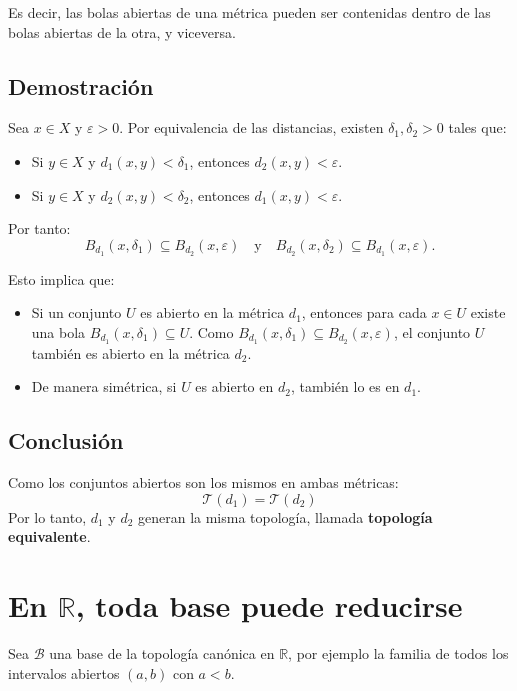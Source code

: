 \documentclass[12pt]{article}
\begin{document}
Es decir, las bolas abiertas de una métrica pueden ser contenidas dentro
de las bolas abiertas de la otra, y viceversa.

\subsection*{Demostración}
Sea \( x \in X \) y \( \varepsilon > 0 \).
Por equivalencia de las distancias, existen \( \delta_1, \delta_2 > 0 \) tales que:

\begin{itemize}
  \item Si \( y \in X \) y \( d_1(x,y) < \delta_1 \), entonces \( d_2(x,y) < \varepsilon \).
  \item Si \( y \in X \) y \( d_2(x,y) < \delta_2 \), entonces \( d_1(x,y) < \varepsilon \).
\end{itemize}

Por tanto:
\[
B_{d_1}(x, \delta_1) \subseteq B_{d_2}(x, \varepsilon)
\quad \text{y} \quad
B_{d_2}(x, \delta_2) \subseteq B_{d_1}(x, \varepsilon).
\]

Esto implica que:
\begin{itemize}
    \item Si un conjunto \(U\) es abierto en la métrica \(d_1\), entonces para cada \(x \in U\)
    existe una bola \(B_{d_1}(x, \delta_1) \subseteq U\).  
    Como \(B_{d_1}(x, \delta_1) \subseteq B_{d_2}(x, \varepsilon)\),
    el conjunto \(U\) también es abierto en la métrica \(d_2\).

    \item De manera simétrica, si \(U\) es abierto en \(d_2\),
    también lo es en \(d_1\).
\end{itemize}

\subsection*{Conclusión}
Como los conjuntos abiertos son los mismos en ambas métricas:
\[
\boxed{\mathcal{T}(d_1) = \mathcal{T}(d_2)}
\]
Por lo tanto, \(d_1\) y \(d_2\) generan la misma topología, llamada \textbf{topología equivalente}.
\section*{En $\mathbb{R}$, toda base puede reducirse}

Sea $\mathcal{B}$ una base de la topología canónica en $\mathbb{R}$, por ejemplo
la familia de todos los intervalos abiertos $(a,b)$ con $a<b$.
\end{document}

